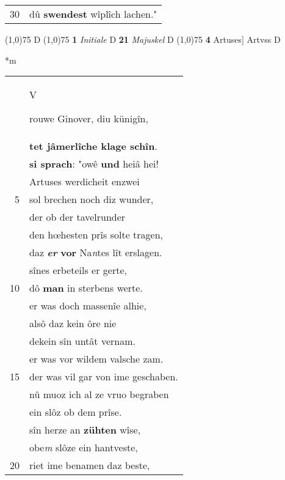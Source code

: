 \documentclass[8pt,a4paper,notitlepage]{article}
\begin{document}
\begin{table}[ht]
\begin{minipage}[t]{0.5\linewidth}
\begin{tabular}{rl}
30 & dû \textbf{swendest} wîplîch lachen."\\ 
\end{tabular}
\scriptsize
\line(1,0){75} \newline
D \newline
\line(1,0){75} \newline
\textbf{1} \textit{Initiale} D  \textbf{21} \textit{Majuskel} D  \newline
\line(1,0){75} \newline
\textbf{4} Artuses] Artvss D \newline
\end{minipage}
\hspace{0.5cm}
\begin{minipage}[t]{0.5\linewidth}
\small
\begin{center}*m
\end{center}
\begin{tabular}{rl}
 & \begin{large}V\end{large}rouwe Ginover, diu künigîn,\\ 
 & \textbf{tet jâmerlîche klage schîn}.\\ 
 & \textbf{si sprach}: "owê \textbf{und} heiâ hei!\\ 
 & Artuses werdicheit enzwei\\ 
5 & sol brechen noch diz wunder,\\ 
 & der ob der tavelrunder\\ 
 & den hœhesten prîs solte tragen,\\ 
 & daz \textit{\textbf{er}} \textbf{vor} Na\textit{n}tes lît erslagen.\\ 
 & sînes erbeteils er gerte,\\ 
10 & dô \textbf{man} in sterbens werte.\\ 
 & er was doch massenîe alhie,\\ 
 & alsô daz kein ôre nie\\ 
 & dekein sîn untât vernam.\\ 
 & er was vor wildem valsche zam.\\ 
15 & der was vil gar von ime geschaben.\\ 
 & nû muoz ich al ze vruo begraben\\ 
 & ein slôz ob dem prîse.\\ 
 & sîn herze an \textbf{zühten} wîse,\\ 
 & obe\textit{m} slôze ein hantveste,\\ 
20 & riet ime benamen daz beste,\\ 

\end{tabular}
\end{minipage}
\end{table}
\end{document}
